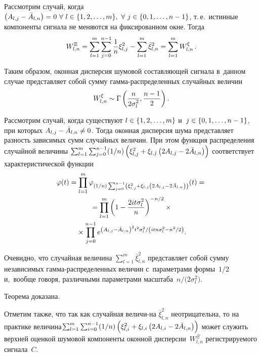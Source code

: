 \begin{multicols}{2}
    Рассмотрим случай, когда $\left( A_{l,j} \hm- \bar{A}_{l,n}\right)\hm = 0 
    \ \forall \   l  \hm\in \{ 1, 2, \ldots, m\}, \ \forall \ 
    j \hm\in \{ 0, 1, \ldots, n-1\} $, т.\,е.\ 
    истинные компоненты сигнала не меняются на фиксированном окне. Тогда
$$
    W_{l,n}^{\Xi} =  \sum\limits_{l=1}^{m}\sum\limits_{j=0}^{n-1}\displaystyle\frac{\displaystyle 1\mathstrut}{\displaystyle n\mathstrut} 
    \xi_{l,j}^{2}  -  \sum\limits_{l=1}^{m}\bar{\xi}_{l,n}^{2}  = 
    \sum\limits_{l=1}^{m} W_{l,n}^{\xi}\,.
$$
    
    Таким образом, оконная дисперсия шумовой составляющей сигнала в~данном 
    случае представляет собой сумму гам\-ма-рас\-пре\-де\-лен\-ных случайных величин
$$
W_{l,n}^{\xi}  \sim  \Gamma\left( \displaystyle\frac{\displaystyle n\mathstrut}{\displaystyle 2\sigma_{l}^{2}\mathstrut}, \displaystyle\frac{\displaystyle n-1\mathstrut}{\displaystyle 2\mathstrut}\right).
$$

    Рассмотрим случай, когда существуют $l \hm\in 
    \{ 1, 2, \ldots, m\}$  и~$j \hm\in \{ 0, 1, \ldots, n-1\}$, 
    при которых $A_{l,j} \hm- \bar{A}_{l,n} \hm\neq 0$. Тогда
 оконная дисперсия шума представляет разность зависимых сумм случайных величин. 
 При этом
функция распределения случайной величины $\sum\nolimits_{l=1}^{m}\sum\nolimits_{j=0}^{n-1}
({1}/{n}) \left( \xi_{l,j}^{2} \hm+ \xi_{l,j} \left( 2A_{l,j}\hm-
2\bar{A}_{l,n}\right)\right)$ соответствует характеристической функции
\begin{multline*}
    \varphi(t)  = \prod\limits_{l=1}^{m}\varphi_{({1}/{n})
     \sum\nolimits_{j=0}^{n-1}\left( \xi_{l,j}^{2} + \xi_{l,j} \left( 
     2A_{l,j}-2\bar{A}_{l,n}\right)\right)}(t) ={}
\\
  {}  =   \prod\limits_{l=1}^{m} \left( 1-\displaystyle\frac{\displaystyle 2it\sigma_l^2\mathstrut}{\displaystyle n\mathstrut}\right)^{-{n}/{2}}\times{}\\
  {}\times  
  \prod\limits_{j=0}^{n-1} 
  e^{{\left(A_{l,j}-\bar{A}_{l,n}\right)^{2}t^{2}\sigma^{2}_{l}}/
  \left({i  t n\sigma^{2}_{l} - {n^{2}}/{2} }\right)}.
\end{multline*}

Очевидно, что случайная величина $\sum\nolimits_{l=1}^{m}\bar{\xi}_{l,n}^{2} $ 
представляет собой сумму независимых гам\-ма-рас\-пре\-де\-лен\-ных величин 
с~параметрами формы~${1}/{2}$ и,~вообще говоря, различными параметрами 
масштаба~${n}/({2\sigma_{l}^{2})}$.

   
Теорема доказана.
    
\smallskip

Отметим также, что так как случайная величи-\linebreak на $\bar{\xi}_{l,n}^{2}$ 
неотрицательна, то
    на практике величина\linebreak $ \sum\nolimits_{l=1}^{m}\sum\nolimits_{i=0}^{n-1}({1}/{n})
     \left( \xi_{l,i}^{2} \hm+ \xi_{l,i} \left( 2A_{l,i}-2\bar{A}_{l,n}\right)\right)$ 
     может служить верхней оценкой шумовой компоненты оконной дисперсии~$W_{l,n}^{\Xi} $ 
     регистрируемого сигнала~$C$.


\end{multicols}
